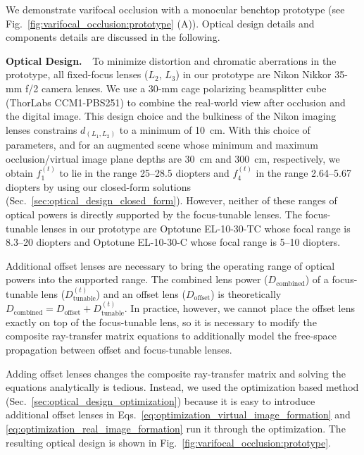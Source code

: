 
We demonstrate varifocal occlusion with a monocular benchtop prototype (see Fig.~\ref{fig:varifocal_occlusion:prototype} (A)). Optical design details and components details are discussed in the following.

{\bf Optical Design. $\,\,$} To minimize distortion and chromatic aberrations in the prototype, all fixed-focus lenses ($L_2$, $L_3$) in our prototype are Nikon Nikkor 35-mm f/2 camera lenses. We use a 30-mm cage polarizing beamsplitter cube (ThorLabs CCM1-PBS251) to combine the real-world view after occlusion and the digital image. This design choice and the bulkiness of the Nikon imaging lenses constrains $d_{(L_1,L_2)}$ to a minimum of 10~cm. With this choice of parameters, and for an augmented scene whose minimum and maximum occlusion/virtual image plane depths are 30~cm and 300~cm, respectively, we obtain $f_1^{(t)}$ to lie in the range 25--28.5 diopters and $f_4^{(t)}$ in the range 2.64--5.67 diopters by using our closed-form solutions (Sec.~\ref{sec:optical_design_closed_form}).
However, neither of these ranges of optical powers is directly supported by the focus-tunable lenses. The focus-tunable lenses in our prototype are Optotune EL-10-30-TC whose focal range is 8.3--20 diopters and Optotune EL-10-30-C whose focal range is 5--10 diopters. 

Additional offset lenses are necessary to bring the operating range of optical powers into the supported range. The combined lens power ($D_{\text{combined}}$) of a focus-tunable lens ($D_{\text{tunable}}^{(t)}$) and an offset lens ($D_{\text{offset}}$) is theoretically $D_{\text{combined}} = D_{\text{offset}} + D_{\text{tunable}}^{(t)}$. In practice, however, we cannot place the offset lens exactly on top of the focus-tunable lens, so it is necessary to modify the composite ray-transfer matrix equations to additionally model the free-space propagation between offset and focus-tunable lenses. 

Adding offset lenses changes the composite ray-transfer matrix and solving the equations analytically is tedious. Instead, we used the optimization based method (Sec.~\ref{sec:optical_design_optimization}) because it is easy to introduce additional offset lenses in Eqs.~\ref{eq:optimization_virtual_image_formation} and \ref{eq:optimization_real_image_formation} run it through the optimization. The resulting optical design is shown in Fig.~\ref{fig:varifocal_occlusion:prototype}. 



